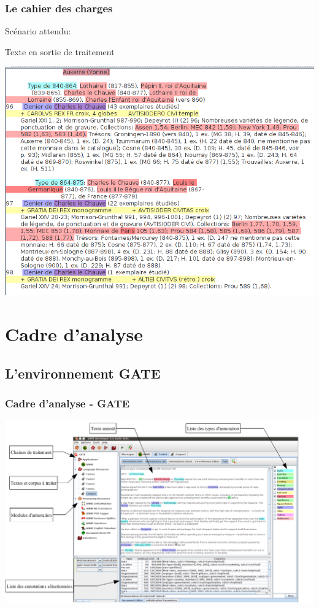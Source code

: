 \documentclass[10pt, compress]{beamer}
\begin{document}
\begin{frame}[fragile]
	\frametitle{Le cahier des charges}
	Scénario attendu:
	\begin{scriptsize}
	Texte en sortie de traitement
	\end{scriptsize}
	\includegraphics[scale=0.3]{img/afteran.png}
\end{frame}

\section{Cadre d'analyse}
\subsection{L'environnement GATE}
\begin{frame}[fragile]
\frametitle{Cadre d'analyse - GATE}
\includegraphics[scale=0.3]{img/exempleAnnotationGATE.png} 
\end{frame}
\end{document}
